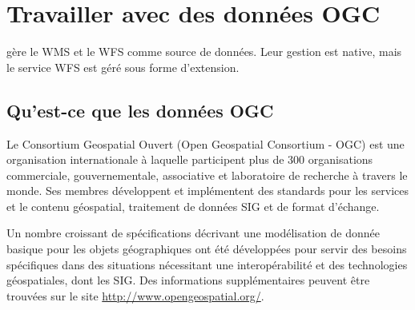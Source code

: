 \chapter{Travailler avec des données OGC}


\qg gère le WMS et le WFS comme source de données. Leur gestion est native, mais le service WFS  est géré sous forme d'extension.

\section{Qu'est-ce que les données OGC}

Le Consortium Geospatial Ouvert (Open Geospatial Consortium - OGC) est une organisation internationale à laquelle participent plus de 300 organisations commerciale, gouvernementale, associative et laboratoire de recherche à travers  le monde. Ses membres développent et implémentent des standards pour les services et le contenu géospatial, traitement de données SIG et de format d'échange.


Un nombre croissant de spécifications décrivant une modélisation de donnée basique pour les objets géographiques ont été développées pour servir des besoins spécifiques dans des situations nécessitant une interopérabilité et des technologies géospatiales, dont les SIG. Des informations supplémentaires peuvent être trouvées sur le site
\url{http://www.opengeospatial.org/}.

